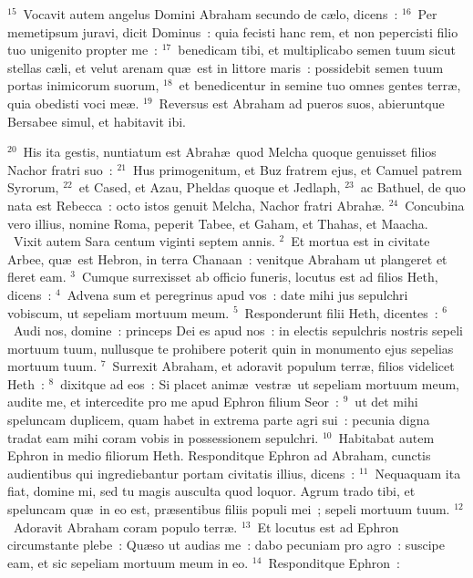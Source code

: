 ${}^{15}$~Vocavit autem angelus Domini Abraham secundo de c\ae lo, dicens~:
${}^{16}$~Per memetipsum juravi, dicit Dominus~: quia fecisti hanc rem, et non pepercisti filio tuo unigenito propter me~:
${}^{17}$~benedicam tibi, et multiplicabo semen tuum sicut stellas c\ae li, et velut arenam qu\ae\ est in littore maris~: possidebit semen tuum portas inimicorum suorum,
${}^{18}$~et benedicentur in semine tuo omnes gentes terr\ae , quia obedisti voci me\ae .
${}^{19}$~Reversus est Abraham ad pueros suos, abieruntque Bersabee simul, et habitavit ibi.


${}^{20}$~His ita gestis, nuntiatum est Abrah\ae\ quod Melcha quoque genuisset filios Nachor fratri suo~:
${}^{21}$~Hus primogenitum, et Buz fratrem ejus, et Camuel patrem Syrorum,
${}^{22}$~et Cased, et Azau, Pheldas quoque et Jedlaph,
${}^{23}$~ac Bathuel, de quo nata est Rebecca~: octo istos genuit Melcha, Nachor fratri Abrah\ae .
${}^{24}$~Concubina vero illius, nomine Roma, peperit Tabee, et Gaham, et Thahas, et Maacha.
~Vixit autem Sara centum viginti septem annis.
${}^{2}$~Et mortua est in civitate Arbee, qu\ae\ est Hebron, in terra Chanaan~: venitque Abraham ut plangeret et fleret eam.
${}^{3}$~Cumque surrexisset ab officio funeris, locutus est ad filios Heth, dicens~:
${}^{4}$~Advena sum et peregrinus apud vos~: date mihi jus sepulchri vobiscum, ut sepeliam mortuum meum.
${}^{5}$~Responderunt filii Heth, dicentes~:
${}^{6}$~Audi nos, domine~: princeps Dei es apud nos~: in electis sepulchris nostris sepeli mortuum tuum, nullusque te prohibere poterit quin in monumento ejus sepelias mortuum tuum.
${}^{7}$~Surrexit Abraham, et adoravit populum terr\ae , filios videlicet Heth~:
${}^{8}$~dixitque ad eos~: Si placet anim\ae\ vestr\ae\ ut sepeliam mortuum meum, audite me, et intercedite pro me apud Ephron filium Seor~:
${}^{9}$~ut det mihi speluncam duplicem, quam habet in extrema parte agri sui~: pecunia digna tradat eam mihi coram vobis in possessionem sepulchri.
${}^{10}$~Habitabat autem Ephron in medio filiorum Heth. Responditque Ephron ad Abraham, cunctis audientibus qui ingrediebantur portam civitatis illius, dicens~:
${}^{11}$~Nequaquam ita fiat, domine mi, sed tu magis ausculta quod loquor. Agrum trado tibi, et speluncam qu\ae\ in eo est, pr\ae sentibus filiis populi mei~; sepeli mortuum tuum.
${}^{12}$~Adoravit Abraham coram populo terr\ae .
${}^{13}$~Et locutus est ad Ephron circumstante plebe~: Qu\ae so ut audias me~: dabo pecuniam pro agro~: suscipe eam, et sic sepeliam mortuum meum in eo.
${}^{14}$~Responditque Ephron~:
